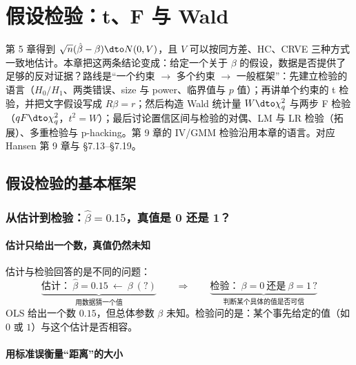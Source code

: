 \chapter{假设检验：t、F 与 Wald}
\label{ch:U06a-test}

第 5 章得到 $\sqrt n(\hat\beta-\beta)\dto N(0,V)$，且 $V$ 可以按同方差、HC、CRVE 三种方式一致地估计。本章把这两条结论变成：给定一个关于 $\beta$ 的假设，数据是否提供了足够的反对证据？路线是“一个约束 $\to$ 多个约束 $\to$ 一般框架”：先建立检验的语言（$H_0/H_1$、两类错误、size 与 power、临界值与 $p$ 值）；再讲单个约束的 t 检验，并把文字假设写成 $R\beta=r$；然后构造 Wald 统计量 $W\dto\chi^2_q$ 与两步 F 检验（$qF\dto\chi^2_q$，$t^2=W$）；最后讨论置信区间与检验的对偶、LM 与 LR 检验（拓展）、多重检验与 p-hacking。第 9 章的 IV/GMM 检验沿用本章的语言。对应 Hansen 第 9 章与 §7.13--§7.19。

\section{假设检验的基本框架}\label{sec:U06a-frame}

\subsection{从估计到检验：\texorpdfstring{$\hat\beta=0.15$}{beta-hat = 0.15}，真值是 0 还是 1？}

\subsubsection{估计只给出一个数，真值仍然未知}

估计与检验回答的是不同的问题：
\[
\underbrace{\text{估计：}\ \hat\beta=0.15\ \longleftarrow\ \beta\ (?)}_{\text{用数据猜一个值}}
\qquad\Longrightarrow\qquad
\underbrace{\text{检验：}\ \beta=0\ \text{还是}\ \beta=1\,?}_{\text{判断某个具体的值是否可信}}
\]
OLS 给出一个数 $0.15$，但总体参数 $\beta$ 未知。检验问的是：某个事先给定的值（如 $0$ 或 $1$）与这个估计是否相容。

\subsubsection{用标准误衡量“距离”的大小}

